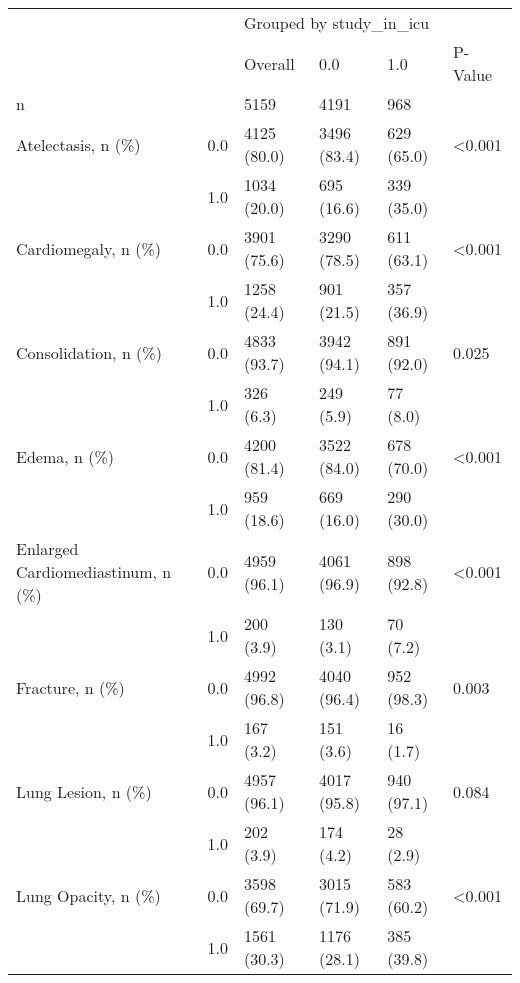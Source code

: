 \begin{tabular}{llllll}
\toprule
                       &     & \multicolumn{4}{l}{Grouped by study\_in\_icu} \\
                       &     &                 Overall &          0.0 &         1.0 & P-Value \\
\midrule
n & {} &                    5159 &         4191 &         968 &         \\
Atelectasis, n (\%) & 0.0 &             4125 (80.0) &  3496 (83.4) &  629 (65.0) &  <0.001 \\
                       & 1.0 &             1034 (20.0) &   695 (16.6) &  339 (35.0) &         \\
Cardiomegaly, n (\%) & 0.0 &             3901 (75.6) &  3290 (78.5) &  611 (63.1) &  <0.001 \\
                       & 1.0 &             1258 (24.4) &   901 (21.5) &  357 (36.9) &         \\
Consolidation, n (\%) & 0.0 &             4833 (93.7) &  3942 (94.1) &  891 (92.0) &   0.025 \\
                       & 1.0 &               326 (6.3) &    249 (5.9) &    77 (8.0) &         \\
Edema, n (\%) & 0.0 &             4200 (81.4) &  3522 (84.0) &  678 (70.0) &  <0.001 \\
                       & 1.0 &              959 (18.6) &   669 (16.0) &  290 (30.0) &         \\
Enlarged Cardiomediastinum, n (\%) & 0.0 &             4959 (96.1) &  4061 (96.9) &  898 (92.8) &  <0.001 \\
                       & 1.0 &               200 (3.9) &    130 (3.1) &    70 (7.2) &         \\
Fracture, n (\%) & 0.0 &             4992 (96.8) &  4040 (96.4) &  952 (98.3) &   0.003 \\
                       & 1.0 &               167 (3.2) &    151 (3.6) &    16 (1.7) &         \\
Lung Lesion, n (\%) & 0.0 &             4957 (96.1) &  4017 (95.8) &  940 (97.1) &   0.084 \\
                       & 1.0 &               202 (3.9) &    174 (4.2) &    28 (2.9) &         \\
Lung Opacity, n (\%) & 0.0 &             3598 (69.7) &  3015 (71.9) &  583 (60.2) &  <0.001 \\
                       & 1.0 &             1561 (30.3) &  1176 (28.1) &  385 (39.8) &         \\

\end{tabular}
